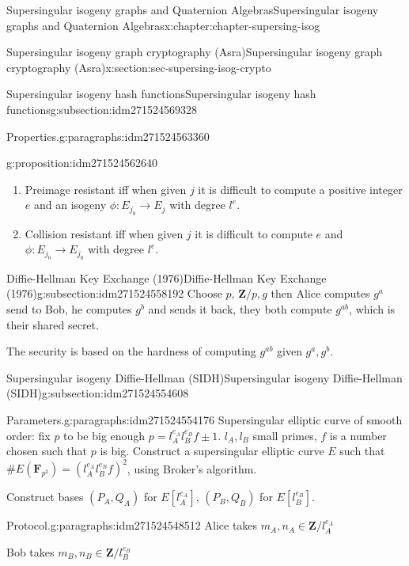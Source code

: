 \documentclass[oneside,10pt,]{book}
\numberwithin{equation}{section}
\newcommand{\lb}{[}
\newcommand{\rb}{]}
\newcommand{\ZZ}{\mathbf{Z}}
\newcommand{\FF}{\mathbf{F}}
\begin{document}
\begin{chapterptx}{Supersingular isogeny graphs and Quaternion Algebras}{}{Supersingular isogeny graphs and Quaternion Algebras}{}{}{x:chapter:chapter-supersing-isog}
\begin{sectionptx}{Supersingular isogeny graph cryptography (Asra)}{}{Supersingular isogeny graph cryptography (Asra)}{}{}{x:section:sec-supersing-isog-crypto}
\begin{subsectionptx}{Supersingular isogeny hash functions}{}{Supersingular isogeny hash functions}{}{}{g:subsection:idm271524569328}
\begin{paragraphs}{Properties.}{g:paragraphs:idm271524563360}
\begin{proposition}{}{}{g:proposition:idm271524562640}
\begin{enumerate}
\item{}Preimage resistant iff when given \(j\) it is difficult to compute a positive integer \(e\) and an isogeny \(\phi\colon E_{j_0} \to E_j\) with degree \(l^e\).%
\item{}Collision resistant iff when given \(j\) it is difficult to compute \(e\) and  \(\phi \colon E_{j_0} \to E_{j_0}\) with degree \(l^e\).%
\end{enumerate}
%
\end{proposition}
\end{paragraphs}%
\end{subsectionptx}
%
%
\typeout{************************************************}
\typeout{************************************************}
%
\begin{subsectionptx}{Diffie-Hellman Key Exchange (1976)}{}{Diffie-Hellman Key Exchange (1976)}{}{}{g:subsection:idm271524558192}
Choose \(p,\, \ZZ/p, g\) then Alice computes \(g^a\) send to Bob, he computes \(g^b\) and sends it back, they both compute \(g^{ab}\), which is their shared secret.%
\par
The security is based on the hardness of computing \(g^{ab}\) given \(g^a,g^b\).%
\end{subsectionptx}
%
%
\typeout{************************************************}
\typeout{************************************************}
%
\begin{subsectionptx}{Supersingular isogeny Diffie-Hellman (SIDH)}{}{Supersingular isogeny Diffie-Hellman (SIDH)}{}{}{g:subsection:idm271524554608}
\begin{paragraphs}{Parameters.}{g:paragraphs:idm271524554176}%
Supersingular elliptic curve of smooth order: fix \(p\) to be big enough \(p = l_A^{e_A} l_B^{e_B} f  \pm 1\). \(l_A,l_B\) small primes, \(f\) is a number chosen such that \(p\) is big. Construct a supersingular elliptic curve \(E\) such that \(\# E(\FF_{p^2}) = (l_A^{e_A}l_B^{e_B} f)^2\), using Broker's algorithm.%
\par
Construct bases \((P_A, Q_A)\) for \(E\lb l_A^{e_A}\rb\), \((P_B, Q_B)\) for \(E\lb l_B^{e_B}\rb\).%
\end{paragraphs}%
\begin{paragraphs}{Protocol.}{g:paragraphs:idm271524548512}%
Alice takes \(m_A,n_A \in \ZZ/l_A^{e_A}\)%
\par
Bob takes \(m_B,n_B \in \ZZ/l_B^{e_B}\)%
\par

\end{paragraphs}
\end{subsectionptx}
\end{sectionptx}
\end{chapterptx}
\end{document}
